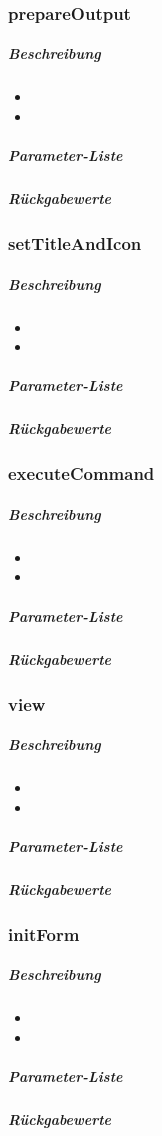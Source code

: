 \subsubsection*{prepareOutput}\label{prepareOutputLGUI}
\subparagraph{Beschreibung}
\begin{itemize}
	\item[] \noindent{} 
	\item[] 
\end{itemize}
\subparagraph{Parameter-Liste}
\subparagraph{Rückgabewerte}

\subsubsection*{setTitleAndIcon}\label{setTitleAndIconLGUI}
\subparagraph{Beschreibung}
\begin{itemize}
	\item[] \noindent{} 
	\item[] 
\end{itemize}
\subparagraph{Parameter-Liste}
\subparagraph{Rückgabewerte}

\subsubsection*{executeCommand}\label{executeCommandLGUI}
\subparagraph{Beschreibung}
\begin{itemize}
	\item[] \noindent{} 
	\item[] 
\end{itemize}
\subparagraph{Parameter-Liste}
\subparagraph{Rückgabewerte}

\subsubsection*{view}\label{viewLGUI}
\subparagraph{Beschreibung}
\begin{itemize}
	\item[] \noindent{} 
	\item[] 
\end{itemize}
\subparagraph{Parameter-Liste}
\subparagraph{Rückgabewerte}

\subsubsection*{initForm}\label{initFormLGUI}
\subparagraph{Beschreibung}
\begin{itemize}
	\item[] \noindent{} 
	\item[] 
\end{itemize}
\subparagraph{Parameter-Liste}
\subparagraph{Rückgabewerte}

